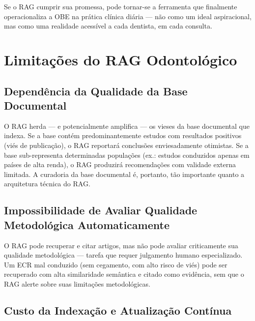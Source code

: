Se o RAG cumprir sua promessa, pode tornar-se a ferramenta que finalmente operacionaliza a OBE na prática clínica diária --- não como um ideal aspiracional, mas como uma realidade acessível a cada dentista, em cada consulta.

\section{Limitações do RAG Odontológico}

\subsection{Dependência da Qualidade da Base Documental}

O RAG herda --- e potencialmente amplifica --- os vieses da base documental que indexa. Se a base contém predominantemente estudos com resultados positivos (viés de publicação), o RAG reportará conclusões enviesadamente otimistas. Se a base sub-representa determinadas populações (ex.: estudos conduzidos apenas em países de alta renda), o RAG produzirá recomendações com validade externa limitada. A curadoria da base documental é, portanto, tão importante quanto a arquitetura técnica do RAG.

\subsection{Impossibilidade de Avaliar Qualidade Metodológica Automaticamente}

O RAG pode recuperar e citar artigos, mas não pode avaliar criticamente sua qualidade metodológica --- tarefa que requer julgamento humano especializado. Um ECR mal conduzido (sem cegamento, com alto risco de viés) pode ser recuperado com alta similaridade semântica e citado como evidência, sem que o RAG alerte sobre suas limitações metodológicas.


\subsection{Custo da Indexação e Atualização Contínua}

